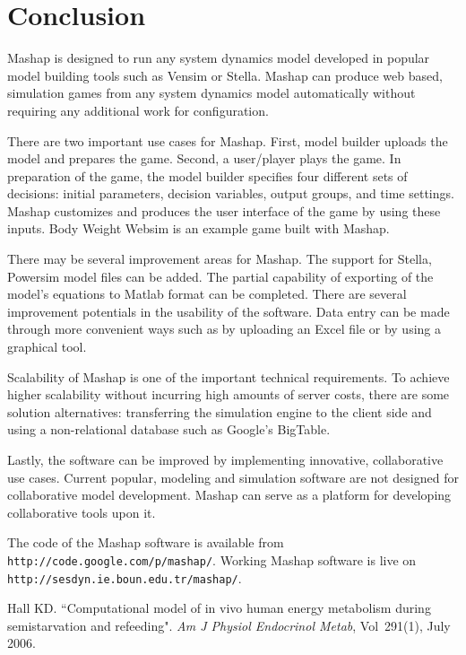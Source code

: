 \documentclass[12pt,a4paper]{paper}
\begin{document}
\section{Conclusion}
Mashap is designed to run any system dynamics model developed in popular model building tools such as Vensim or Stella. Mashap can produce web based, simulation games from any system dynamics model automatically without requiring any additional work for configuration.

There are two important use cases for Mashap. First, model builder uploads the model and prepares the game. Second, a user/player plays the game. In preparation of the game, the model builder specifies four different sets of decisions: initial parameters, decision variables, output groups, and time settings. Mashap customizes and produces the user interface of the game by using these inputs. Body Weight Websim is an example game built with Mashap. 

There may be several improvement areas for Mashap. The support for Stella, Powersim model files can be added. The partial capability of exporting of the model's equations to Matlab format can be completed. There are several improvement potentials in the usability of the software. Data entry can be made through more convenient ways such as by uploading an Excel file or by using a graphical tool.

Scalability of Mashap is one of the important technical requirements. To achieve higher scalability without incurring high amounts of server costs, there are some solution alternatives: transferring the simulation engine to the client side and using a non-relational database such as Google's BigTable.

Lastly, the software can be improved by implementing innovative, collaborative use cases. Current popular, modeling and simulation software are not designed for collaborative model development. Mashap can serve as a platform for developing collaborative tools upon it.

The code of the Mashap software is available from \lstinline|http://code.google.com/p/mashap/|. Working Mashap software is live on \lstinline|http://sesdyn.ie.boun.edu.tr/mashap/|.

\begin{thebibliography}{99}

     Hall KD. ``Computational model of in vivo human energy metabolism during semistarvation and refeeding". \textit{Am J Physiol Endocrinol Metab}, Vol~291(1), July 2006.

\end{thebibliography}
\end{document}
